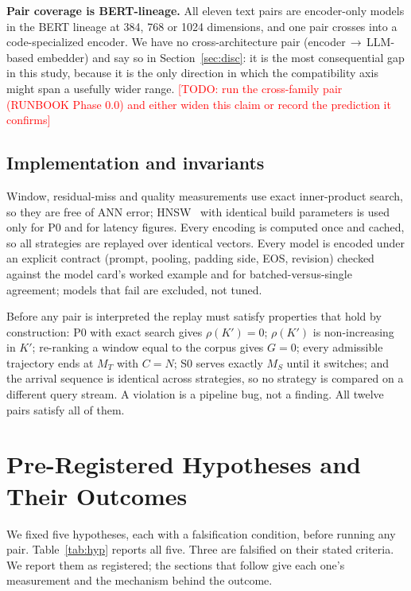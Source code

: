\documentclass[conference]{IEEEtran}
\newcommand{\todo}[1]{\textcolor{red}{[TODO: #1]}}
\begin{document}
\textbf{Pair coverage is BERT-lineage.} All eleven text pairs are encoder-only models in
the BERT lineage at 384, 768 or 1024 dimensions, and one pair crosses into a
code-specialized encoder. We have no cross-architecture pair (encoder\,$\to$\,LLM-based
embedder) and say so in Section~\ref{sec:disc}: it is the most consequential gap in this
study, because it is the only direction in which the compatibility axis might span a
usefully wider range. \todo{run the cross-family pair (RUNBOOK Phase 0.0) and either
widen this claim or record the prediction it confirms}

\subsection{Implementation and invariants}
Window, residual-miss and quality measurements use exact inner-product search, so they
are free of ANN error; HNSW~\cite{hnsw} with identical build parameters is used only for
P0 and for latency figures. Every encoding is computed once and cached, so all strategies
are replayed over identical vectors. Every model is encoded under an explicit contract
(prompt, pooling, padding side, EOS, revision) checked against the model card's worked
example and for batched-versus-single agreement; models that fail are excluded, not
tuned.

Before any pair is interpreted the replay must satisfy properties that hold by
construction: P0 with exact search gives $\rho(K'){=}0$; $\rho(K')$ is non-increasing in
$K'$; re-ranking a window equal to the corpus gives $G{=}0$; every admissible trajectory
ends at $M_T$ with $C{=}N$; S0 serves exactly $M_S$ until it switches; and the arrival
sequence is identical across strategies, so no strategy is compared on a different query
stream. A violation is a pipeline bug, not a finding. All twelve pairs satisfy all of
them.

\section{Pre-Registered Hypotheses and Their Outcomes}\label{sec:hyp}

We fixed five hypotheses, each with a falsification condition, before running any pair.
Table~\ref{tab:hyp} reports all five. Three are falsified on their stated criteria.
We report them as registered; the sections that follow give each one's measurement and
the mechanism behind the outcome.
\end{document}
